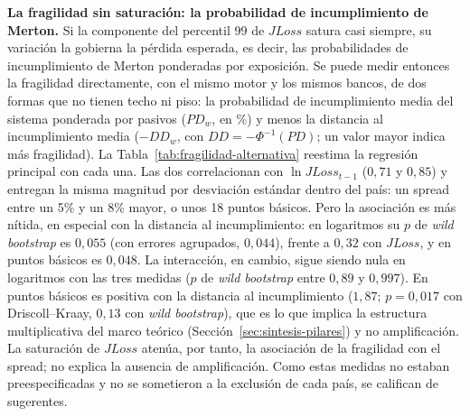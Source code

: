 \textbf{La fragilidad sin saturación: la probabilidad de incumplimiento de Merton.} Si la componente del percentil 99 de $JLoss$ satura casi siempre, su variación la gobierna la pérdida esperada, es decir, las probabilidades de incumplimiento de Merton ponderadas por exposición. Se puede medir entonces la fragilidad directamente, con el mismo motor y los mismos bancos, de dos formas que no tienen techo ni piso: la probabilidad de incumplimiento media del sistema ponderada por pasivos ($PD_w$, en \%) y menos la distancia al incumplimiento media ($-DD_w$, con $DD=-\Phi^{-1}(PD)$; un valor mayor indica más fragilidad). La Tabla~\ref{tab:fragilidad-alternativa} reestima la regresión principal con cada una. Las dos correlacionan con $\ln JLoss_{t-1}$ ($0{,}71$ y $0{,}85$) y entregan la misma magnitud por desviación estándar dentro del país: un spread entre un 5\% y un 8\% mayor, o unos 18 puntos básicos. Pero la asociación es más nítida, en especial con la distancia al incumplimiento: en logaritmos su $p$ de \textit{wild bootstrap} es $0{,}055$ (con errores agrupados, $0{,}044$), frente a $0{,}32$ con $JLoss$, y en puntos básicos es $0{,}048$. La interacción, en cambio, sigue siendo nula en logaritmos con las tres medidas ($p$ de \textit{wild bootstrap} entre $0{,}89$ y $0{,}997$). En puntos básicos es positiva con la distancia al incumplimiento ($1{,}87$; $p=0{,}017$ con Driscoll--Kraay, $0{,}13$ con \textit{wild bootstrap}), que es lo que implica la estructura multiplicativa del marco teórico (Sección~\ref{sec:sintesis-pilares}) y no amplificación. La saturación de $JLoss$ atenúa, por tanto, la asociación de la fragilidad con el spread; no explica la ausencia de amplificación. Como estas medidas no estaban preespecificadas y no se sometieron a la exclusión de cada país, se califican de sugerentes.

